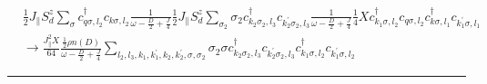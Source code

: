 \documentclass[12pt]{revtex4-2}
\begin{document}
\begin{equation}\begin{aligned}
	&\frac{1}{2}J_\parallel S_d^z \sum_\sigma c^\dagger_{q \sigma, l_2}c_{k \sigma, l_2}\frac{1}{\omega - \frac{D}{2} + \frac{J}{4}}\frac{1}{2}J_\parallel S_d^z \sum_{\sigma_2} \sigma_2 c^\dagger_{k_2 \sigma_2, l_3}c_{k_2^\prime \sigma_2, l_3} \frac{1}{\omega - \frac{D}{2} + \frac{J}{4}} \frac{1}{4}X c^\dagger_{k_1\sigma,l_2}c_{q\sigma,l_2} c^\dagger_{k\sigma,l_1}c_{k_1^\prime\sigma,l_1}\\
	&\longrightarrow \frac{J_\parallel^2 X}{64} \frac{\frac{1}{2}\rho n(D)}{\omega - \frac{D}{2} + \frac{J}{4}}\sum_{l_2, l_3, k_1,k_1^\prime,k_2,k_2^\prime,\sigma,\sigma_2} \sigma_2 \sigma c^\dagger_{k_2 \sigma_2, l_3}c_{k_2^\prime \sigma_2, l_3} c^\dagger_{k_1\sigma,l_2}c_{k_1^\prime\sigma,l_2}
\end{aligned}\end{equation}

\hrule
\end{document}
